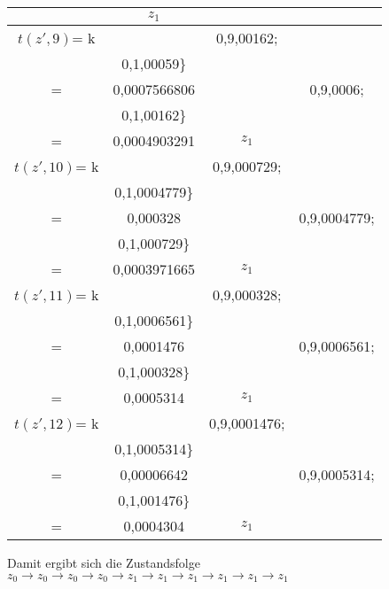 \begin{center}
\begin{tabular}{cccc}
					\) & \(z_{1}\)\\ \hline
\(t(z',9)\)= k	& \(	\begin{array} {r@{}l@{}}
							0,5\cdot\max\{	& 0,9\cdot0,00162; \\
											& 0,1\cdot0,00059\}\\
										   =& 0,0007566806
					\end{array}
					\)
				&   \(	\begin{array} {r@{}l@{}}
							0,9\cdot\max\{	& 0,9\cdot0,0006; \\
											& 0,1\cdot0,00162\}\\
										   =& 0,0004903291
					\end{array}
					\) & \(z_{1}\)\\ \hline
\(t(z',10)\)= k	& \(	\begin{array} {r@{}l@{}}
							0,5\cdot\max\{	& 0,9\cdot0,000729; \\
											& 0,1\cdot0,0004779\}\\
										   =& 0,000328
					\end{array}
					\)
				&   \(	\begin{array} {r@{}l@{}}
							0,9\cdot\max\{	& 0,9\cdot0,0004779; \\
											& 0,1\cdot0,000729\}\\
										   =& 0,0003971665
					\end{array}
					\) & \(z_{1}\)\\ \hline
\(t(z',11)\)= k	& \(	\begin{array} {r@{}l@{}}
							0,5\cdot\max\{	& 0,9\cdot0,000328; \\
											& 0,1\cdot0,0006561\}\\
										   =& 0,0001476
					\end{array}
					\)
				&   \(	\begin{array} {r@{}l@{}}
							0,9\cdot\max\{	& 0,9\cdot0,0006561; \\
											& 0,1\cdot0,000328\}\\
										   =& 0,0005314
					\end{array}
					\) & \(z_{1}\)\\ \hline
\(t(z',12)\)= k	& \(	\begin{array} {r@{}l@{}}
							0,5\cdot\max\{	& 0,9\cdot0,0001476; \\
											& 0,1\cdot0,0005314\}\\
										   =& 0,00006642
					\end{array}
					\)
				&   \(	\begin{array} {r@{}l@{}}
							0,9\cdot\max\{	& 0,9\cdot0,0005314; \\
											& 0,1\cdot0,001476\}\\
										   =& 0,0004304
					\end{array}
					\) & \(z_{1}\)
\end{tabular}
\end{center}
Damit ergibt sich die Zustandsfolge \(z_{0} \rightarrow z_{0} \rightarrow z_{0} \rightarrow z_{0} \rightarrow z_{1} \rightarrow z_{1}\rightarrow z_{1} \rightarrow z_{1}\rightarrow z_{1}\rightarrow z_{1}\)

